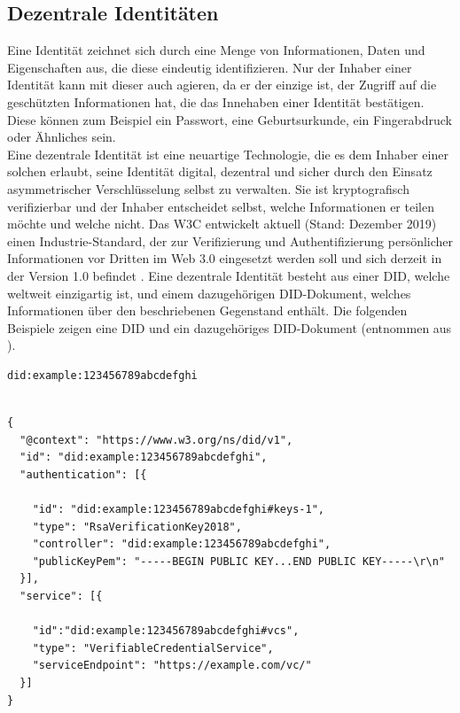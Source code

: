 \subsection{Dezentrale Identitäten}
\label{subsec:fundamentals:dlt:did}
Eine Identität zeichnet sich durch eine Menge von Informationen, Daten und Eigenschaften aus, die diese eindeutig identifizieren. Nur der Inhaber einer Identität kann mit dieser auch agieren, da er der einzige ist, der Zugriff auf die geschützten Informationen hat, die das Innehaben einer Identität bestätigen. Diese können zum Beispiel ein Passwort, eine Geburtsurkunde, ein Fingerabdruck oder Ähnliches sein.\\
Eine dezentrale Identität ist eine neuartige Technologie, die es dem Inhaber einer solchen erlaubt, seine Identität digital, dezentral und sicher durch den Einsatz asymmetrischer Verschlüsselung selbst zu verwalten. Sie ist kryptografisch verifizierbar und der Inhaber entscheidet selbst, welche Informationen er teilen möchte und welche nicht. Das \ac{W3C} entwickelt aktuell (Stand: Dezember 2019) einen Industrie-Standard, der zur Verifizierung und Authentifizierung persönlicher Informationen vor Dritten im Web 3.0 eingesetzt werden soll und sich derzeit in der Version 1.0 befindet \cite{did2019}. Eine dezentrale Identität besteht aus einer \ac{DID}, welche weltweit einzigartig ist, und einem dazugehörigen DID-Dokument, welches Informationen über den beschriebenen Gegenstand enthält. Die folgenden Beispiele zeigen eine \ac{DID} und ein dazugehöriges DID-Dokument (entnommen aus \cite{did2019}).

\begin{lstlisting}[caption=Beispiel einer DID,label=listing:did]
did:example:123456789abcdefghi
\end{lstlisting}

\begin{lstlisting}[caption=Beispiel eines DID-Dokuments,label=listing:did_document]

{
  "@context": "https://www.w3.org/ns/did/v1",
  "id": "did:example:123456789abcdefghi",
  "authentication": [{

    "id": "did:example:123456789abcdefghi#keys-1",
    "type": "RsaVerificationKey2018",
    "controller": "did:example:123456789abcdefghi",
    "publicKeyPem": "-----BEGIN PUBLIC KEY...END PUBLIC KEY-----\r\n"
  }],
  "service": [{

    "id":"did:example:123456789abcdefghi#vcs",
    "type": "VerifiableCredentialService",
    "serviceEndpoint": "https://example.com/vc/"
  }]
}
\end{lstlisting}

